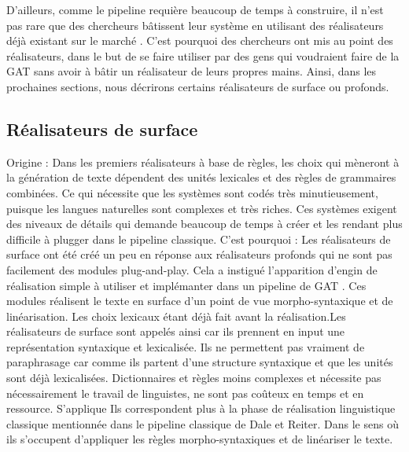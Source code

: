 D'ailleurs, comme le pipeline requière beaucoup de temps à construire, il n'est pas rare que des chercheurs bâtissent leur système en utilisant des réalisateurs déjà existant sur le marché \citep{EssersChoosingSurfaceRealiser1998}. C'est pourquoi des chercheurs ont mis au point des réalisateurs, dans le but de se faire utiliser par des gens qui voudraient faire de la \ac{GAT} sans avoir à bâtir un réalisateur de leurs propres mains. Ainsi, dans les prochaines sections, nous décrirons certains réalisateurs de surface ou profonds.

\subsection{Réalisateurs de surface}

Origine : Dans les premiers réalisateurs à base de règles, les choix qui mèneront à la génération de texte dépendent des unités lexicales et des règles de grammaires combinées. Ce qui nécessite que les systèmes sont codés très minutieusement, puisque les langues naturelles sont complexes et très riches. Ces systèmes exigent des niveaux de détails qui demande beaucoup de temps à créer et les rendant plus difficile à plugger dans le pipeline classique. C'est pourquoi  : Les réalisateurs de surface ont été créé un peu en réponse aux réalisateurs profonds qui ne sont pas facilement des modules plug-and-play. Cela a instigué l'apparition d'engin de réalisation simple à utiliser et implémanter dans un pipeline de \ac{GAT} \citep{gatt18}. Ces modules réalisent le texte en surface d'un point de vue morpho-syntaxique et de linéarisation. Les choix lexicaux étant déjà fait avant la réalisation.Les réalisateurs de surface sont appelés ainsi car ils prennent en input une représentation syntaxique et  lexicalisée. Ils ne permettent pas vraiment de paraphrasage car comme ils partent d'une structure syntaxique et que les unités sont déjà lexicalisées. Dictionnaires et règles moins complexes et nécessite pas nécessairement le travail de linguistes, ne sont pas coûteux en temps et en ressource. S'applique  Ils correspondent plus à la phase de réalisation linguistique classique mentionnée dans le pipeline classique de Dale et Reiter. Dans le sens où ils s'occupent d'appliquer les règles morpho-syntaxiques et de linéariser le texte. 

